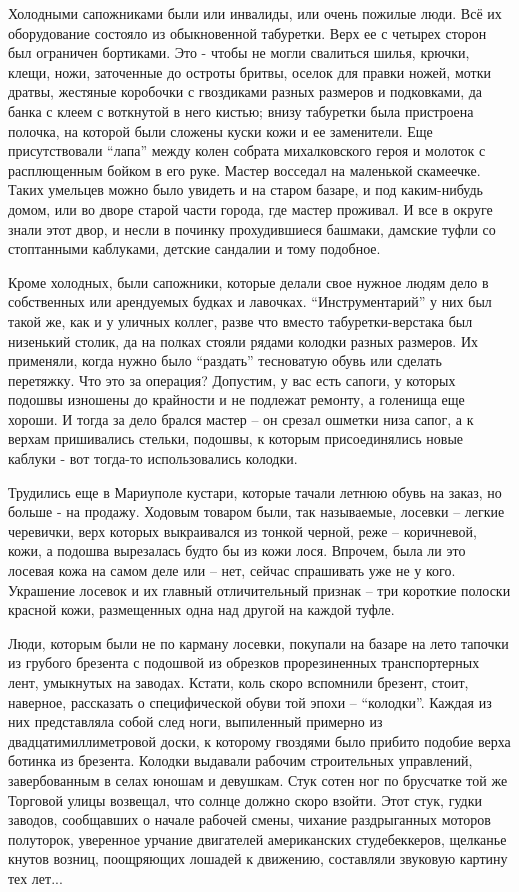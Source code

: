 Холодными сапожниками были или инвалиды, или очень пожилые люди. Всё их
оборудование состояло из обыкновенной табуретки.  Верх ее  с четырех сторон был
ограничен бортиками. Это - чтобы не могли свалиться шилья, крючки, клещи, ножи,
заточенные до остроты бритвы, оселок для  правки ножей, мотки дратвы, жестяные
коробочки с гвоздиками разных размеров и подковками, да банка с клеем с
воткнутой в него кистью; внизу табуретки была пристроена полочка, на которой
были сложены куски кожи и ее заменители. Еще присутствовали \enquote{лапа} между колен
собрата михалковского героя и молоток с расплющенным бойком в его руке. Мастер
восседал на маленькой скамеечке. Таких умельцев  можно было увидеть и на старом
базаре, и под каким-нибудь домом, или во дворе старой части города, где мастер
проживал. И все в округе знали этот двор, и несли в починку прохудившиеся
башмаки, дамские туфли со стоптанными каблуками, детские сандалии и тому
подобное. 

Кроме холодных, были сапожники, которые делали свое нужное людям дело в
собственных или арендуемых будках и лавочках. \enquote{Инструментарий} у них был такой
же, как и у уличных коллег, разве что вместо табуретки-верстака был низенький
столик, да на полках стояли рядами колодки разных размеров. Их применяли, когда
нужно было \enquote{раздать} тесноватую обувь или сделать перетяжку. Что это за
операция? Допустим, у вас есть сапоги, у которых подошвы изношены до крайности
и не подлежат ремонту, а голенища еще хороши. И тогда за дело брался мастер –
он срезал ошметки низа сапог, а к верхам пришивались стельки, подошвы, к
которым присоединялись новые каблуки - вот тогда-то использовались колодки.

Трудились еще в Мариуполе кустари, которые тачали летнюю обувь на заказ, но
больше - на продажу. Ходовым товаром были, так называемые, лосевки – легкие
черевички, верх которых выкраивался из тонкой черной, реже – коричневой, кожи,
а подошва вырезалась будто бы из кожи лося. Впрочем, была ли это лосевая кожа
на самом деле или – нет, сейчас спрашивать уже не у кого. Украшение лосевок и
их главный отличительный признак – три короткие полоски красной кожи,
размещенных одна над другой на каждой туфле. 

Люди, которым были не по карману лосевки, покупали на базаре на лето тапочки из
грубого брезента с подошвой из обрезков прорезиненных транспортерных лент,
умыкнутых на заводах. Кстати, коль скоро вспомнили брезент, стоит, наверное,
рассказать о специфической обуви той эпохи – \enquote{колодки}. Каждая из них
представляла собой след ноги,  выпиленный примерно из двадцатимиллиметровой
доски, к которому гвоздями было прибито подобие верха ботинка из брезента.
Колодки выдавали рабочим строительных управлений, завербованным в селах юношам
и девушкам.  Стук сотен ног по брусчатке той же  Торговой улицы возвещал, что
солнце должно скоро взойти. Этот стук, гудки заводов, сообщавших о начале
рабочей смены, чихание  раздрыганных моторов полуторок, уверенное урчание
двигателей американских студебеккеров, щелканье кнутов возниц, поощряющих
лошадей к движению, составляли звуковую картину тех лет...

